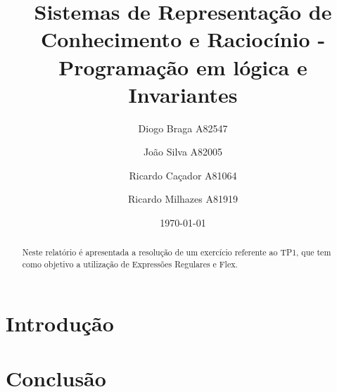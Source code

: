 \documentclass[a4paper]{article}
\title{Sistemas de Representação de Conhecimento e Raciocínio - Programação em lógica e Invariantes}
\author{Diogo Braga A82547 \and João Silva A82005 \and Ricardo Caçador A81064 
\and Ricardo Milhazes A81919}
\date{\today}
\begin{document}
\maketitle

\begin{abstract}
Neste relatório é apresentada a resolução de um exercício referente ao TP1, que tem como objetivo a utilização de Expressões Regulares e Flex.
\end{abstract}

\tableofcontents

\newpage


\section{Introdução}
\label{sec:intro}

\section{Conclusão}
\label{sec:conclusao}
\end{document}
